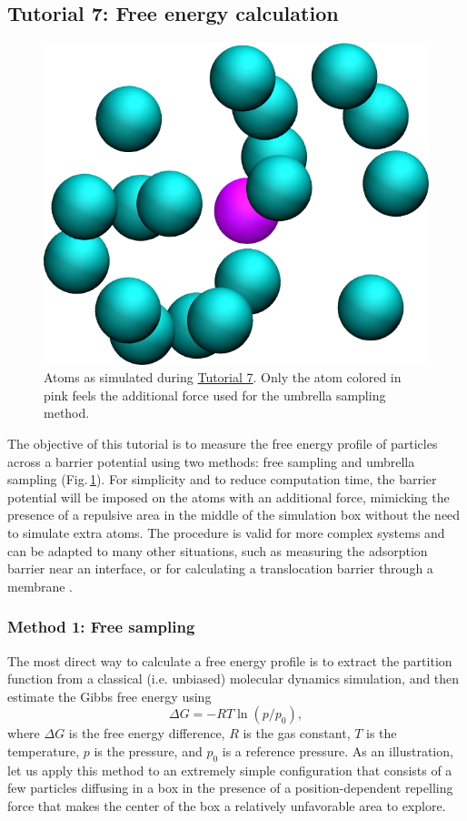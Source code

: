 \documentclass[9pt,tutorial]{livecoms}
\begin{document}
\subsection{Tutorial 7: Free energy calculation}
\label{umbrella-sampling-label}

\begin{figure}
\centering
\includegraphics[width=0.55\linewidth]{US}
\caption{Atoms as simulated during \hyperref[umbrella-sampling-label]{Tutorial 7}. Only the atom colored in pink feels the additional force used for the umbrella sampling method.}
\label{fig:US}
\end{figure}

\noindent The objective of this tutorial is to measure the free energy profile of particles across a barrier potential using two methods: free sampling and umbrella sampling \cite{kastner2011umbrella, allen2017computer, frenkel2023understanding} (Fig.\,\ref{fig:US}). For simplicity and to reduce computation time, the barrier potential will be imposed on the atoms with an additional force, mimicking the presence of a repulsive area in the middle of the simulation box without the need to simulate extra atoms. The procedure is valid for more complex systems and can be adapted to many other situations, such as measuring the adsorption barrier near an interface, or for calculating a translocation barrier through a membrane \cite{wilson1997adsorption, makarov2009computer, gravelle2021adsorption}.

\subsubsection{Method 1: Free sampling}
The most direct way to calculate a free energy profile is to extract the partition function from a classical (i.e. unbiased) molecular dynamics simulation, and then estimate the Gibbs free energy using 
\begin{equation}
\Delta G = -RT \ln(p/p_0),
\label{eq:G}
\end{equation}
where $\Delta G$ is the free energy difference, $R$ is the gas constant, $T$ is the temperature, $p$ is the pressure, and $p_0$ is a reference pressure. As an illustration, let us apply this method to an extremely simple configuration that consists of a few particles diffusing in a box in the presence of a position-dependent repelling force that makes the center of the box a relatively unfavorable area to explore.
\end{document}
